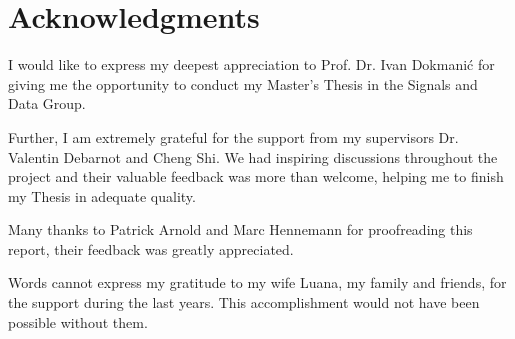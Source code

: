 \chapter{Acknowledgments}

I would like to express my deepest appreciation to Prof. Dr. Ivan Dokmanić
for giving me the opportunity to conduct my Master's Thesis in the 
Signals and Data Group.

\bigskip

Further, I am extremely grateful for the support from my supervisors
Dr. Valentin Debarnot and Cheng Shi. We had inspiring discussions
throughout the project and their valuable feedback was more than welcome,
helping me to finish my Thesis in adequate quality.

\bigskip
Many thanks to Patrick Arnold and Marc Hennemann for 
proofreading this report, their feedback was greatly appreciated.

\bigskip
Words cannot express my gratitude to my wife Luana, my family and friends,
for the support during the last years.
This accomplishment would not have been possible without them.